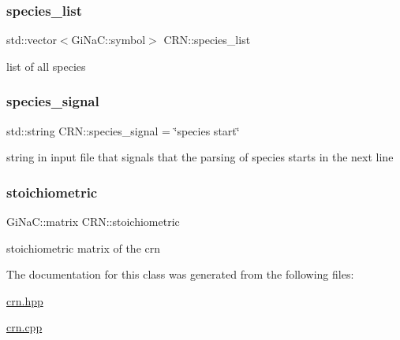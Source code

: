 \subsubsection{\texorpdfstring{species\+\_\+list}{species\_list}}
{\footnotesize\ttfamily std\+::vector$<$Gi\+Na\+C\+::symbol$>$ C\+R\+N\+::species\+\_\+list}



list of all species 

\mbox{\label{classCRN_a47d1cac1fe4387b2b643ef2c6b6f5617}} 
\subsubsection{\texorpdfstring{species\+\_\+signal}{species\_signal}}
{\footnotesize\ttfamily std\+::string C\+R\+N\+::species\+\_\+signal = \char`\"{}species start\char`\"{}}



string in input file that signals that the parsing of species starts in the next line 

\mbox{\label{classCRN_a2fc9c358b31175f36e569bebcf6809b5}} 
\subsubsection{\texorpdfstring{stoichiometric}{stoichiometric}}
{\footnotesize\ttfamily Gi\+Na\+C\+::matrix C\+R\+N\+::stoichiometric}



stoichiometric matrix of the crn 



The documentation for this class was generated from the following files\+:\begin{DoxyCompactItemize}
\item 
\mbox{\hyperlink{crn_8hpp}{crn.\+hpp}}\item 
\mbox{\hyperlink{crn_8cpp}{crn.\+cpp}}\end{DoxyCompactItemize}
